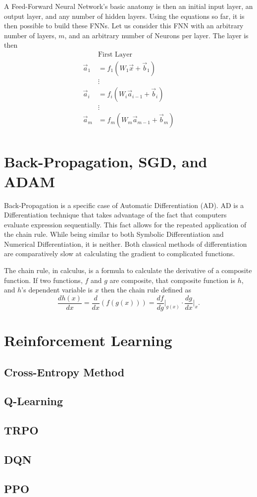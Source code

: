 \documentclass{article}
\begin{document}
A Feed-Forward Neural Network's basic anatomy is then an initial input layer, an output layer, and any number of hidden layers. Using the equations so far, it is then possible to build these FNNs. Let us consider this FNN with an arbitrary number of layers, $m$, and an arbitrary number of Neurons per layer. The layer is then 
\begin{align*}
&\text{First Layer} \\
\vec{a}_1 &= f_1(W_1\vec{x} +\vec{b}_1 )\\
&\vdots\\
\vec{a}_i &= f_i(W_i\vec{a}_{i-1}+\vec{b}_i)\\
&\vdots\\
\vec{a}_m &= f_m(W_m\vec{a}_{m-1}+\vec{b}_m)\\
\end{align*}

\section{Back-Propagation, SGD, and ADAM}

Back-Propagation is a specific case of Automatic Differentiation (AD). AD is a Differentiation technique that takes advantage of the fact that computers evaluate expression sequentially. This fact allows for the repeated application of the chain rule. While being similar to both Symbolic Differentiation and Numerical Differentiation, it is neither. Both classical methods of differentiation are comparatively slow at calculating the gradient to complicated functions. 

The chain rule, in calculus, is a formula to calculate the derivative of a composite function. If two functions, $f$ and $g$ are composite, that composite function is $h$, and $h$'s dependent variable is $x$ then the chain rule defined as 
$$\frac{dh(x)}{dx}=\frac{d}{dx}(f(g(x)))=\frac{df}{dg}\bigg|_{g(x)}\cdot\frac{dg}{dx}\bigg|_{x}.$$

\section{Reinforcement Learning}

\subsection{Cross-Entropy Method}

\subsection{Q-Learning}

\subsection{TRPO}

\subsection{DQN}

\subsection{PPO}
\end{document}

